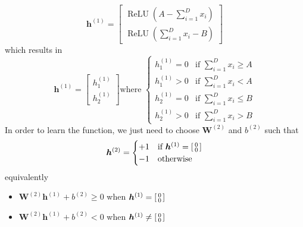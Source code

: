 \documentclass[11pt]{article}
\DeclareMathOperator{\relu}{ReLU}
\begin{document}
\begin{equation*}
  \bm{h}^{(1)} = \begin{bmatrix}
                   \relu \left( A - \sum_{i = 1}^{D} x_{i} \right) \\
                   \relu \left( \sum_{i = 1}^{D} x_{i} - B \right)
                 \end{bmatrix}
\end{equation*}
which results in
\begin{equation*}
  \bm{h}^{(1)} = \begin{bmatrix}
                   h^{(1)}_{1} \\
                   h^{(1)}_{2}
                 \end{bmatrix} \text{where }
                 \begin{cases}
                   h_{1}^{(1)} = 0 &\text{if } \sum_{i = 1}^{D} x_{i} \geq A \\
                   h_{1}^{(1)} > 0 &\text{if } \sum_{i = 1}^{D} x_{i} < A \\
                   h_{2}^{(1)} = 0 &\text{if } \sum_{i = 1}^{D} x_{i} \leq B \\
                   h_{2}^{(1)} > 0 &\text{if } \sum_{i = 1}^{D} x_{i} > B
                 \end{cases}
\end{equation*}
In order to learn the function, we just need to choose $\bm{W}^{(2)}$ and $b^{(2)}$ such that
\begin{align*}
  \bm{h}^{(2)} &= \begin{cases}
                    +1 &\text{if } \bm{h}^{(1)} =  \begin{bsmallmatrix}
                                                     0 \\
                                                     0
                                                   \end{bsmallmatrix} \\
                    -1 &\text{otherwise}
                  \end{cases} \\
\end{align*}
equivalently
\begin{itemize}
\item $\bm{W}^{(2)} \bm{h}^{(1)} + b^{(2)} \geq 0$ when $\bm{h}^{(1)} = \begin{bsmallmatrix} 0 \\ 0 \end{bsmallmatrix}$
\item $\bm{W}^{(2)} \bm{h}^{(1)} + b^{(2)} < 0$ when $\bm{h}^{(1)} \neq \begin{bsmallmatrix} 0 \\ 0 \end{bsmallmatrix}$
\end{itemize}
\end{document}
